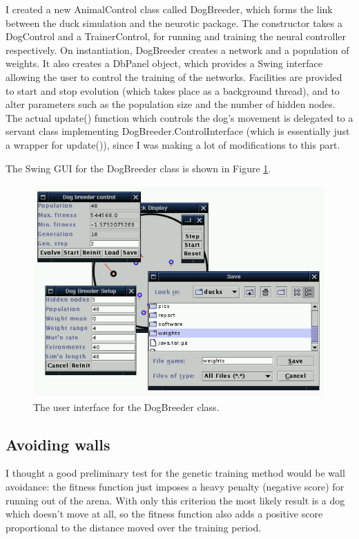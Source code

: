 \documentclass[a4paper]{report}
\newcommand{\code}[1]{{\ttfamily #1}}
\begin{document}
I created a new \code{AnimalControl} class called \code{DogBreeder},
which forms the link between the duck simulation and the
\code{neurotic} package. The constructor takes a \code{DogControl} and
a \code{TrainerControl}, for running and training the neural
controller respectively. On instantiation, \code{DogBreeder} creates a
network and a population of weights. It also creates a \code{DbPanel}
object, which provides a Swing interface allowing the user to control
the training of the networks. Facilities are provided to start and
stop evolution (which takes place as a background thread), and to
alter parameters such as the population size and the number of hidden
nodes. The actual \code{update()} function which controls the dog's
movement is delegated to a servant class implementing
\code{DogBreeder.ControlInterface} (which is essentially just a
wrapper for \code{update()}), since I was making a lot of
modifications to this part.

The Swing GUI for the \code{DogBreeder} class is shown in Figure
\ref{fig-ga-ui}.

\begin{figure}[htb]
\centerline{\includegraphics{figs/ga-ui.pdf}}
\caption{\label{fig-ga-ui}The user interface for the \code{DogBreeder}
class.}
\end{figure}

\subsection{Avoiding walls}

I thought a good preliminary test for the genetic training method
would be wall avoidance: the fitness function just imposes a heavy
penalty (negative score) for running out of the arena. With only this
criterion the most likely result is a dog which doesn't move at all,
so the fitness function also adds a positive score proportional to the
distance moved over the training period.
\end{document}
